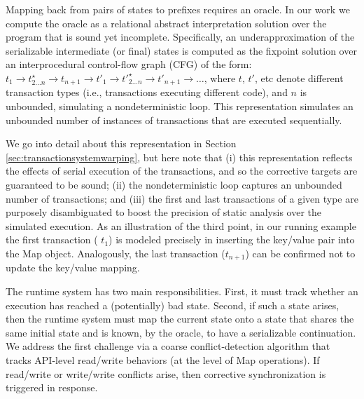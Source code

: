 Mapping back from pairs of states to prefixes requires an oracle. In our work we compute the oracle as a relational abstract interpretation solution over the program that is sound yet incomplete. Specifically, an underapproximation of the serializable intermediate (or final) states is computed as the fixpoint solution over an interprocedural control-flow graph (CFG) of the form: 
	$t_1 \rightarrow t^\star_{2 \ldots n} \rightarrow t_{n+1} \rightarrow t'_1 \rightarrow t'^\star_{2 \ldots n} \rightarrow t'_{n+1} \rightarrow \ldots$,
where $t$, $t'$, etc denote different transaction types (i.e., transactions executing different code), and $n$ is unbounded, simulating a nondeterministic loop. This representation simulates an unbounded number of instances of transactions that are executed sequentially.

We go into detail about this representation in Section \ref{sec:transactionsystemwarping}, but here note that (i) this representation reflects the effects of serial execution of the transactions, and so the corrective targets are guaranteed to be sound; (ii) the nondeterministic loop captures an unbounded number of transactions; and (iii) the first and last transactions of a given type are purposely disambiguated to boost the precision of static analysis over the simulated execution.
%
As an illustration of the third point, in our running example the first transaction ( $t_1$) is modeled precisely in inserting the key/value pair into the {\sf Map} object. Analogously, the last transaction ($t_{n+1}$) can be confirmed not to update the key/value mapping.

%
The runtime system has two main responsibilities. First, it must track whether an execution has reached a (potentially) bad state. Second, if such a state arises, then the runtime system must map the current state onto a state that shares the same initial state and is known, by the oracle, to have a serializable continuation. 
%
We address the first challenge via a coarse conflict-detection algorithm that tracks API-level read/write behaviors (at the level of {\sf Map} operations). If read/write or write/write conflicts arise, then corrective synchronization is triggered in response. 


